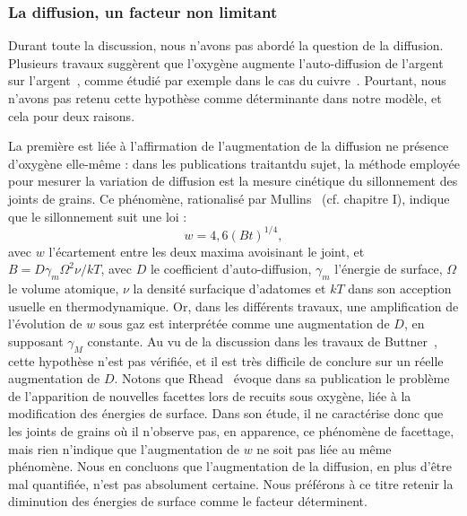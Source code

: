 {{			\subsubsection{La diffusion, un facteur non limitant}
Durant toute la discussion, nous n’avons pas abordé la question de la diffusion. Plusieurs travaux suggèrent que l’oxygène augmente l’auto-diffusion de l’argent sur l’argent~\cite{rhead1963surface, yoshihara1979effect}, comme étudié par exemple dans le cas du cuivre~\cite{bradshaw1964surface}. Pourtant, nous n’avons pas retenu cette hypothèse comme déterminante dans notre modèle, et cela pour deux raisons.\par 
La première est liée à l’affirmation de l’augmentation de la diffusion ne présence d'oxygène elle-même : dans les publications traitantdu sujet, la méthode employée pour mesurer la variation de diffusion est la mesure cinétique du sillonnement des joints de grains. Ce phénomène, rationalisé par Mullins~\cite{mullins1957theory} (cf. chapitre I), indique que le sillonnement suit une loi :
\begin{equation}
w = 4,6(Bt)^{1/4},
\end{equation}
avec $w$ l’écartement entre les deux maxima avoisinant le joint, et $B = D\gamma_m \Omega^2\nu/kT$, avec $D$ le
coefficient d’auto-diffusion, $\gamma_m $ l’énergie de surface, $\Omega$ le volume atomique, $\nu$ la densité surfacique
d’adatomes et $kT$ dans son acception usuelle en thermodynamique. Or, dans les différents travaux, une amplification de l’évolution de $w$ sous gaz est interprétée comme une augmentation de $D$, en supposant $\gamma_M$ constante. Au vu de la discussion dans les travaux de Buttner~\cite{buttner1952adsorption}, cette hypothèse n’est pas vérifiée, et il est très difficile de conclure sur un réelle augmentation de $D$. Notons que Rhead~\cite{rhead1963surface} évoque dans sa publication le problème de l’apparition de nouvelles facettes lors de recuits sous oxygène, liée à la modification des énergies de surface. Dans son étude, il ne caractérise donc que les joints de grains où il n’observe pas, en apparence, ce phénomène de facettage, mais rien n'indique que l'augmentation de $w$ ne soit pas liée au même phénomène. Nous en concluons que l’augmentation de la diffusion, en plus d’être mal quantifiée, n’est pas absolument certaine. Nous préférons à ce titre retenir la diminution des énergies de surface comme le facteur déterminent.\par 
}}
